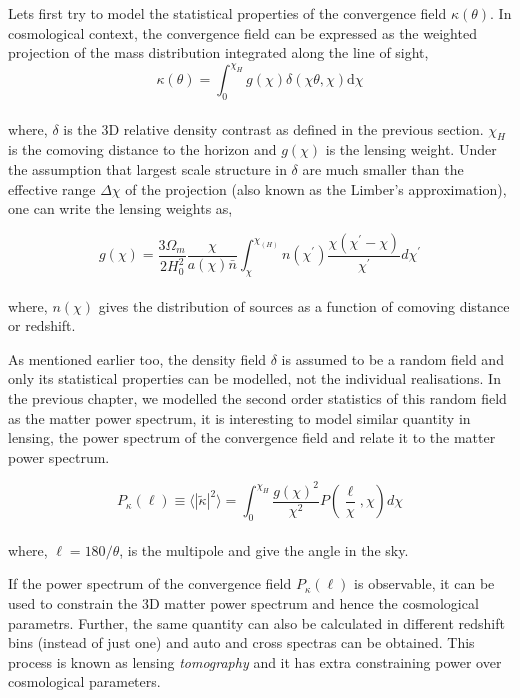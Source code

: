 Lets first try to model the statistical properties of the convergence field
$\kappa(\theta)$. In cosmological context, the convergence field can be expressed
as the weighted projection of the mass distribution integrated along the line of 
sight,
\begin{equation}
	\kappa(\theta) = \int_0^{\chi_H} g(\chi)\delta(\chi\theta,\chi) \mathrm{d}\chi
\end{equation}
\\
where, $\delta$ is the 3D relative density contrast as defined in the previous section.
$\chi_H$ is the comoving distance to the horizon and $g(\chi)$ is the lensing 
weight. Under the assumption that largest scale structure in $\delta$ are much smaller
than the effective range $\Delta \chi$ of the projection (also known as the Limber's 
approximation), one can write the lensing weights as,

\begin{equation}
	g(\chi) = \dfrac{3\Omega_m}{2H_0^2} \dfrac{\chi}{a(\chi)\bar{n}} \int_{\chi}^{\chi_(H)}
					n(\chi^{\prime}) \dfrac{\chi(\chi^{\prime}-\chi)}{\chi^{\prime}}d\chi^{\prime}
\end{equation}
\\
where, $n(\chi)$ gives the distribution of sources as a function of comoving distance or redshift.

As mentioned earlier too, the density field $\delta$ is assumed to be a random field
and only its statistical properties can be modelled, not the individual realisations. 
In the previous chapter, we modelled the second order statistics of this random field
as the matter power spectrum, it is interesting to model similar quantity in lensing,
the power spectrum of the convergence field and relate it to the matter power spectrum.


\begin{equation}
	P_{\kappa}(\ell) \equiv \langle |\tilde{\kappa}|^2 \rangle = 
			\int_0^{\chi_H} \dfrac{g(\chi)^2}{\chi^2} 
			P(\dfrac{\ell}{\chi},\chi) d\chi
\end{equation}
\\
where, $\ell = 180/\theta$, is the multipole and give the angle in the sky. 

If the power spectrum of the convergence field $P_{\kappa}(\ell)$ is observable, it can be
used to constrain the 3D matter power spectrum and hence the cosmological parametrs. Further,
the same quantity can also be calculated in different redshift bins (instead of just one) and
auto and cross spectras can be obtained. This process is known as 
lensing {\it tomography} and it has extra constraining power over cosmological parameters. 

